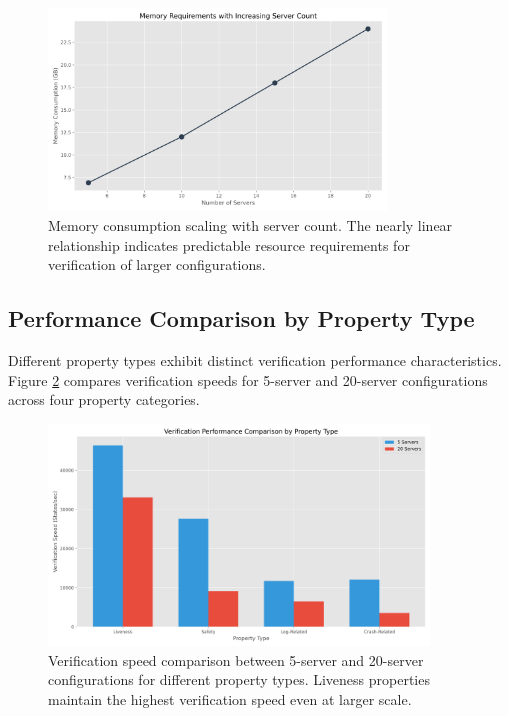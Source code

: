 \begin{figure}[htbp]
    \centering
    \includegraphics[width=0.8\textwidth]{graphs/memory_consumption.png}
    \caption{Memory consumption scaling with server count. The nearly linear relationship indicates predictable resource requirements for verification of larger configurations.}
    \label{fig:memory-consumption}
\end{figure}

\subsection{Performance Comparison by Property Type}

Different property types exhibit distinct verification performance characteristics. Figure \ref{fig:verification-performance} compares verification speeds for 5-server and 20-server configurations across four property categories.

\begin{figure}[htbp]
    \centering
    \includegraphics[width=0.9\textwidth]{graphs/verification_performance.png}
    \caption{Verification speed comparison between 5-server and 20-server configurations for different property types. Liveness properties maintain the highest verification speed even at larger scale.}
    \label{fig:verification-performance}
\end{figure}


